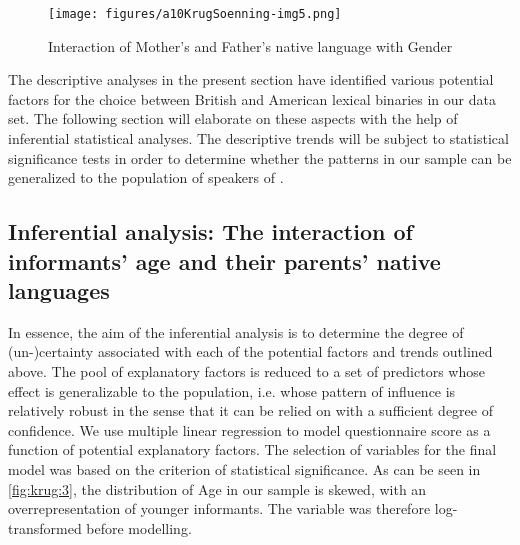 \documentclass[output=paper]{langsci/langscibook}
\begin{document}
\begin{figure}
\texttt{[image: figures/a10KrugSoenning-img5.png]}
\caption{Interaction of Mother’s and Father's native language with Gender}
\label{fig:krug:5}
\end{figure}

The descriptive analyses in the present section have identified various potential factors for the choice between British and American lexical binaries in our data set. The following section will elaborate on these aspects with the help of inferential statistical analyses. The descriptive trends will be subject to statistical significance tests in order to determine whether the patterns in our sample can be generalized to the population of speakers of . 

\subsection{Inferential analysis: The interaction of informants’ age and their parents’ native languages}


In essence, the aim of the inferential analysis is to determine the degree of (un-)\-certainty associated with each of the potential factors and trends outlined above. The pool of explanatory factors is reduced to a set of predictors whose effect is generalizable to the population, i.e. whose pattern of influence is relatively robust in the sense that it can be relied on with a sufficient degree of confidence. We use multiple linear regression to model questionnaire score as a function of potential explanatory factors. The selection of variables for the final model was based on the criterion of statistical significance. As can be seen in \ref{fig:krug:3},  the distribution of Age in our sample is skewed, with an overrepresentation of younger informants. The variable was therefore log-transformed before modelling. 
\end{document}
